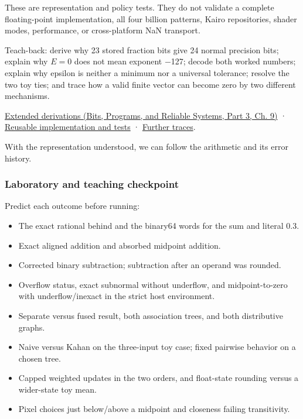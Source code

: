 These are representation and policy tests. They do not validate a complete floating-point implementation, all four billion patterns, Kairo repositories, shader modes, performance, or cross-platform NaN transport.

Teach-back: derive why 23 stored fraction bits give 24 normal precision bits; explain why \(E=0\) does not mean exponent −127; decode both worked numbers; explain why epsilon is neither a minimum nor a universal tolerance; resolve the two toy ties; and trace how a valid finite vector can become zero by two different mechanisms.

\href{../01-Bits-Programs-and-Reliable-Systems-P03/main.pdf\#nameddest=01-foundations-i-ch011-m004---floating-point-fields-spacing-and-rounding}{Extended derivations (Bits, Programs, and Reliable Systems, Part 3, Ch. 9)} · \hyperref[appendix-4e2236f53445-m004---binary-interchange-inspection-and-strict-rounding-laboratory]{Reusable implementation and tests} · \hyperref[appendix-92ff77d4dfdc-m004---from-fields-to-values-and-failure-paths]{Further traces}.

With the representation understood, we can follow the arithmetic and its error history.

\subsubsection{Laboratory and teaching checkpoint}\label{05-engine-i-ch001-laboratory-and-teaching-checkpoint}

\hypertarget{05-engine-i-ch001-laboratory-and-teaching-checkpoint}{}

Predict each outcome before running:

\begin{itemize}
\tightlist
\item
  The exact rational behind  and the binary64 words for the sum and literal 0.3.
\item
  Exact aligned addition and absorbed midpoint addition.
\item
  Corrected binary subtraction; subtraction after an operand was rounded.
\item
  Overflow status, exact subnormal without underflow, and midpoint-to-zero with underflow/inexact in the strict host environment.
\item
  Separate versus fused result, both association trees, and both distributive graphs.
\item
  Naive versus Kahan on the three-input toy case; fixed pairwise behavior on a chosen tree.
\item
  Capped weighted updates in the two orders, and float-state rounding versus a wider-state toy mean.
\item
  Pixel choices just below/above a midpoint and closeness failing transitivity.
\end{itemize}

